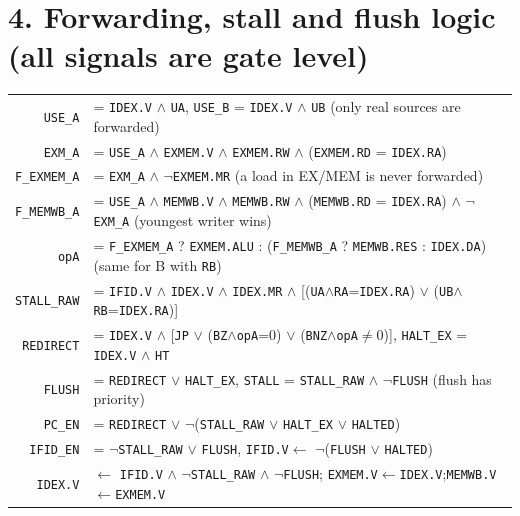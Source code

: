 \documentclass[10pt,a4paper]{article}
\begin{document}
\section*{4. Forwarding, stall and flush logic (all signals are gate level)}
\begin{center}\footnotesize\setlength{\tabcolsep}{3pt}
\begin{tabular}{r l}
\texttt{USE\_A} &= \texttt{IDEX.V} $\wedge$ \texttt{UA}, \quad \texttt{USE\_B} = \texttt{IDEX.V} $\wedge$ \texttt{UB} \hfill (only real sources are forwarded)\\
\texttt{EXM\_A} &= \texttt{USE\_A} $\wedge$ \texttt{EXMEM.V} $\wedge$ \texttt{EXMEM.RW} $\wedge$ (\texttt{EXMEM.RD} = \texttt{IDEX.RA})\\
\texttt{F\_EXMEM\_A} &= \texttt{EXM\_A} $\wedge$ $\lnot$\texttt{EXMEM.MR} \hfill (a load in EX/MEM is never forwarded)\\
\texttt{F\_MEMWB\_A} &= \texttt{USE\_A} $\wedge$ \texttt{MEMWB.V} $\wedge$ \texttt{MEMWB.RW} $\wedge$ (\texttt{MEMWB.RD} = \texttt{IDEX.RA}) $\wedge$ $\lnot$\texttt{EXM\_A} \hfill (youngest writer wins)\\
\texttt{opA} &= \texttt{F\_EXMEM\_A} ? \texttt{EXMEM.ALU} : (\texttt{F\_MEMWB\_A} ? \texttt{MEMWB.RES} : \texttt{IDEX.DA}) \hfill (same for B with \texttt{RB})\\[3pt]
\texttt{STALL\_RAW} &= \texttt{IFID.V} $\wedge$ \texttt{IDEX.V} $\wedge$ \texttt{IDEX.MR} $\wedge$
   [(\texttt{UA}$\wedge$\texttt{RA}=\texttt{IDEX.RA}) $\vee$ (\texttt{UB}$\wedge$\texttt{RB}=\texttt{IDEX.RA})]\\
\texttt{REDIRECT} &= \texttt{IDEX.V} $\wedge$ [\texttt{JP} $\vee$ (\texttt{BZ}$\wedge$\texttt{opA}=0) $\vee$ (\texttt{BNZ}$\wedge$\texttt{opA}$\neq$0)],
  \quad \texttt{HALT\_EX} = \texttt{IDEX.V} $\wedge$ \texttt{HT}\\
\texttt{FLUSH} &= \texttt{REDIRECT} $\vee$ \texttt{HALT\_EX}, \quad \texttt{STALL} = \texttt{STALL\_RAW} $\wedge$ $\lnot$\texttt{FLUSH} (flush has priority)\\
\texttt{PC\_EN} &= \texttt{REDIRECT} $\vee$ $\lnot$(\texttt{STALL\_RAW} $\vee$ \texttt{HALT\_EX} $\vee$ \texttt{HALTED})\\
\texttt{IFID\_EN} &= $\lnot$\texttt{STALL\_RAW} $\vee$ \texttt{FLUSH}, \quad \texttt{IFID.V}$\leftarrow$ $\lnot$(\texttt{FLUSH} $\vee$ \texttt{HALTED})\\
\texttt{IDEX.V} &$\leftarrow$ \texttt{IFID.V} $\wedge$ $\lnot$\texttt{STALL\_RAW} $\wedge$ $\lnot$\texttt{FLUSH};\quad
  \texttt{EXMEM.V}$\leftarrow$\texttt{IDEX.V};\quad \texttt{MEMWB.V}$\leftarrow$\texttt{EXMEM.V}\\
\end{tabular}
\end{center}
\end{document}
